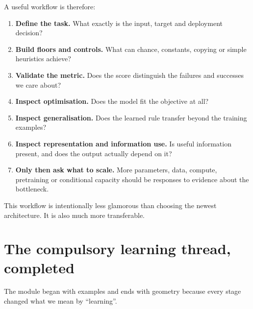 A useful workflow is therefore:
\begin{enumerate}[leftmargin=*]
  \item \textbf{Define the task.} What exactly is the input, target and deployment decision?
  \item \textbf{Build floors and controls.} What can chance, constants, copying or simple heuristics achieve?
  \item \textbf{Validate the metric.} Does the score distinguish the failures and successes we care about?
  \item \textbf{Inspect optimisation.} Does the model fit the objective at all?
  \item \textbf{Inspect generalisation.} Does the learned rule transfer beyond the training examples?
  \item \textbf{Inspect representation and information use.} Is useful information present, and does the output actually depend on it?
  \item \textbf{Only then ask what to scale.} More parameters, data, compute, pretraining or conditional capacity should be responses to evidence about the bottleneck.
\end{enumerate}

This workflow is intentionally less glamorous than choosing the newest architecture. It is also much more transferable.

\section{The compulsory learning thread, completed}

The module began with examples and ends with geometry because every stage changed what we mean by ``learning''.


